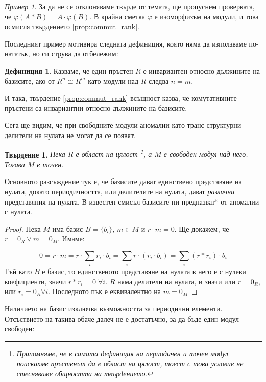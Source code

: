 \documentclass{article}
\newif\ifusemulticols
\theoremstyle{definition}
\newtheorem{deff}{Дефиниция}
\theoremstyle{remark}
\newtheorem{example}{Пример}[section]
\theoremstyle{plain}
\theoremstyle{plain}
\newtheorem{prop}[theorem]{Твърдение}
\newenvironment{mymulticols}
    { \ifusemulticols \begin{multicols}{2} \fi }
    { \ifusemulticols \end{multicols} \fi }
\begin{document}
\begin{mymulticols}
\begin{example}
    За да не се отклоняваме твърде от темата, ще пропуснем проверката, че $\varphi(A * B) = A\cdot
    \varphi(B)$. В крайна сметка $\varphi$ е изоморфизъм на модули, и това осмисля твърдението
    \ref{prop:commut_rank}.
\end{example}

Последният пример мотивира следната дефиниция, която няма да използваме по-нататък, но си струва да
отбележим:

\begin{deff}
    Казваме, че един пръстен $R$ е инвариантен относно дължините на базисите, ако от $R^n \cong R^m$
    като модули над $R$ следва $n=m$.
\end{deff}

И така, твърдение \ref{prop:commut_rank} всъщност казва, че комутативните пръстени са инвариантни
относно дължините на базисите.

Сега ще видим, че при свободните модули аномалии като транс-структурни делители на нулата не могат
да се появят.

\begin{prop}
    Нека $R$ е област на цялост%
    \footnote{Припомняме, че в самата дефиниция на периодичен и точен модул поискахме пръстенът да е
    област на цялост, тоест с това условие не стесняваме общността на твърдението.},
    а $M$ е свободен модул над него. Тогава $M$ е точен.
\end{prop}

Основното разсъждение тук е, че базисите дават единствено представяне на нулата, докато
периодичността, или делителите на нулата, дават \emph{различни} представяния на нулата. В известен
смисъл базисите ни \quotedblbase предпазват`` от аномалии с нулата.

\begin{proof}
    Нека $M$ има базис $B=\{b_i\}$, $m \in M$ и $r\cdot m = 0$. Ще докажем, че $r = 0_R \lor m=0_M$. Имаме:

    $$0 = r \cdot m = r \cdot \sum_i r_i \cdot b_i = \sum_i r \cdot (r_i \cdot b_i)=\sum_i (r*r_i)\cdot b_i$$
    Тъй като $B$ е базис, то единственото представяне на нулата в него е с нулеви коефициенти, значи
    $r*r_i = 0 \; \forall i$. $R$ няма делители на нулата, и значи или $r = 0_R$, или $r_i = 0_R
    \forall i$. Последното пък е еквивалентно на $m = 0_M$
\end{proof}

Наличието на базис изключва възможността за периодични елементи. Отсъствието на такива обаче далеч
не е достатъчно, за да бъде един модул свободен:


\end{mymulticols}
\end{document}
